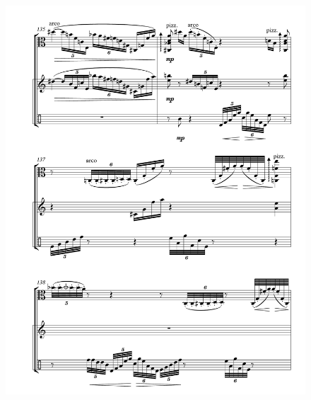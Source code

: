 \begin{figure}[htbp]
    \centering
	\includegraphics[width=6.5in]{figures/Viola_Percussion_19.pdf}
\end{figure}

